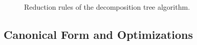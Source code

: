 \begin{figure}[h!]
\begin{center}
{
}
\caption{Reduction rules of the decomposition tree algorithm.}
\label{fig:rules}
\end{center}
\end{figure}

\subsection{Canonical Form and Optimizations}
